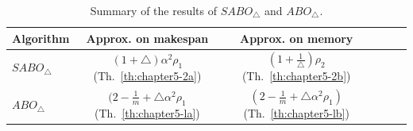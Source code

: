   \begin{table}[ht]
      \centering
      \begin{tabular}{|l|c|c|c|c|c|}
        \hline
        Algorithm & Approx. on makespan & Approx. on memory  \\
        \hline
        $SABO_\triangle$&
        $(1+\triangle)\alpha^2 \rho_1$ (Th.~\ref{th:chapter5-2a})& $(1+\frac{1}{\triangle})\rho_2$ (Th.~\ref{th:chapter5-2b})   \\
        \hline
                $ABO_\triangle$&
                $(2-\frac{1}{m}+\triangle\alpha^2 \rho_1$ (Th.~\ref{th:chapter5-la})& $(2-\frac{1}{m}+\triangle\alpha^2 \rho_1)$ (Th.~\ref{th:chapter5-lb})   \\
        
        
        
        
        \hline
      \end{tabular}
      \caption{Summary of the results of $SABO_\triangle$ and $ABO_\triangle$.}
      \label{tab:template2}
    \end{table}
  
